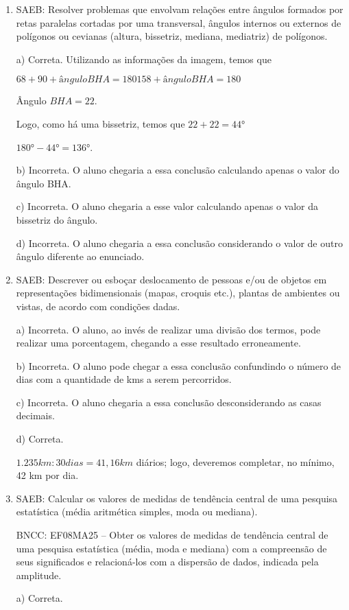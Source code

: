 \begin{enumerate}
\item SAEB: Resolver problemas que envolvam relações entre ângulos formados
por retas paralelas cortadas por uma transversal, ângulos internos ou
externos de polígonos ou cevianas (altura, bissetriz, mediana,
mediatriz) de polígonos.

a) Correta. Utilizando as informações da imagem, temos que

$68 + 90 + ângulo BHA = 180

158 + ângulo BHA = 180$

Ângulo $BHA = 22$.

Logo, como há uma bissetriz, temos que $22 + 22= 44°$

$180°- 44°= 136°$.

b) Incorreta. O aluno chegaria a essa conclusão calculando apenas o
valor do ângulo BHA.

c) Incorreta. O aluno chegaria a esse valor calculando apenas o
valor da bissetriz do ângulo.

d) Incorreta. O aluno chegaria a essa conclusão considerando o
valor de outro ângulo diferente ao enunciado.

\item SAEB: Descrever ou esboçar deslocamento de pessoas e/ou de objetos em
representações bidimensionais (mapas, croquis etc.), plantas de
ambientes ou vistas, de acordo com condições dadas.

a) Incorreta. O aluno, ao invés de realizar uma divisão dos termos, pode
realizar uma porcentagem, chegando a esse resultado erroneamente.

b) Incorreta. O aluno pode chegar a essa conclusão confundindo o
número de dias com a quantidade de kms a serem percorridos.

c) Incorreta. O aluno chegaria a essa conclusão desconsiderando as
casas decimais.

d) Correta. 

$1.235km : 30 dias = 41,16 km$ diários; logo, deveremos completar, no
mínimo, 42 km por dia.

\item SAEB: Calcular os valores de medidas de tendência central de uma
pesquisa estatística (média aritmética simples, moda ou mediana).

BNCC: EF08MA25 -- Obter os valores de medidas de tendência central de
uma pesquisa estatística (média, moda e mediana) com a compreensão de
seus significados e relacioná-los com a dispersão de dados, indicada
pela amplitude.

a) Correta. 


\end{enumerate}
